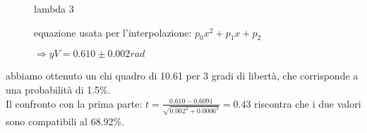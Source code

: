 \documentclass[a4paper]{article}
\theoremstyle{definition}
\begin{document}
\begin{figure}[!htbp]
    	\captionsetup{labelformat=empty}
        \caption{lambda 3}
    \end{figure}
    
    \begin{figure}[!ht]
        	\captionsetup{labelformat=empty}

			\caption{equazione usata per l'interpolazione: $p_{0}x^{2} + p_{1}x + p_{2}$}
	\caption{ $ \Rightarrow yV =  0.610 \pm 0.002rad$}
\end{figure}

\noindent abbiamo ottenuto un chi quadro di 10.61 per 3 gradi di libertà, che corrisponde a una probabilità di 1.5\%.\\
\noindent Il confronto con la prima parte: \( t = \frac{0.610 - 0.6091}{\sqrt{  0.002^{2}+0.0006^{2}  }} = 0.43\) riscontra che i due valori sono compatibili al 68.92\%.
\end{document}
